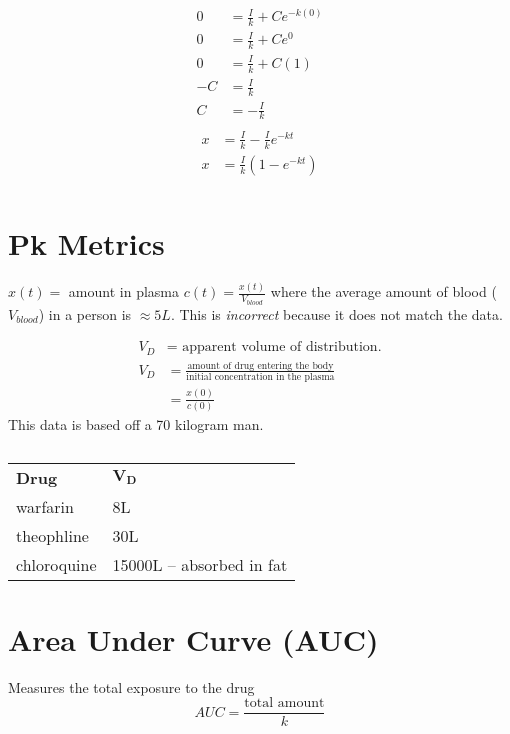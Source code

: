 \documentclass[
	date={September 9{,} 2024}
]{math486notes}
\begin{document}
\begin{example}
\begin{equation*}
	\begin{aligned}
		0 &= \frac{I}{k} + Ce^{-k(0)}\\
		0 &= \frac{I}{k} + Ce^{0}\\
		0 &= \frac{I}{k} + C(1)\\
		-C &= \frac{I}{k}\\
		C &= -\frac{I}{k}\\
	\end{aligned}
	\end{equation*}
	\begin{equation*}
	\begin{aligned}
		x &= \frac{I}{k} - \frac{I}{k}e^{-kt}\\
		x &= \frac{I}{k} \left( 1 - e^{-kt} \right)\\
	\end{aligned}
	\end{equation*}
\end{example}

\section{Pk Metrics}\label{sec:pk-metrics}
$x(t) = $ amount in plasma
$c(t) = \frac{x(t)}{V_{blood}}$ where the average amount of blood ($V_{blood}$) in a person is $\approx 5L$. This is \emph{incorrect} because it does not match the data.

\begin{equation}
\begin{aligned}
	V_{D} &= \mbox{ apparent volume of distribution.}\\ %
	V_{D} &= \frac{\mbox{amount of drug entering the body}}{\mbox{initial concentration in the plasma}}\\
		  &= \frac{x(0)}{c(0)}
\end{aligned}
	\label{eq:}
\end{equation}
This data is based off a 70 kilogram man.

\begin{table}[H]
	\centering
	\caption{}
	\label{tab:}
	\begin{tabular}{ll}
		\textbf{Drug} & $\mathbf{V_{D}}$\\
		warfarin & 8L\\
		theophline & 30L\\
		chloroquine & 15000L -- absorbed in fat
	\end{tabular}
\end{table}

\section{Area Under Curve (AUC)}\label{sec:area-under-curve-(auc)}
Measures the total exposure to the drug
\[ AUC = \frac{\mbox{total amount}}{k} \]
\end{document}
